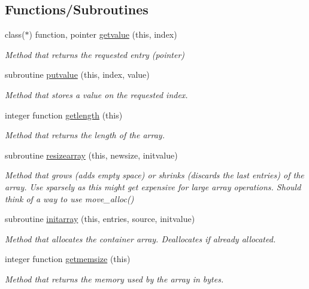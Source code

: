 \subsection*{Functions/\+Subroutines}
\begin{DoxyCompactItemize}
\item 
class($\ast$) function, pointer \mbox{\hyperlink{namespaceabstract__container__array__mod_a2b3e0aec504d76c73bf7f18158924af4}{getvalue}} (this, index)
\begin{DoxyCompactList}\small\item\em Method that returns the requested entry (pointer) \end{DoxyCompactList}\item 
subroutine \mbox{\hyperlink{namespaceabstract__container__array__mod_aae1f6309c51e282a528ce78f128443e0}{putvalue}} (this, index, value)
\begin{DoxyCompactList}\small\item\em Method that stores a value on the requested index. \end{DoxyCompactList}\item 
integer function \mbox{\hyperlink{namespaceabstract__container__array__mod_a22d71ca3f03bf0bb5d3737338e5e349a}{getlength}} (this)
\begin{DoxyCompactList}\small\item\em Method that returns the length of the array. \end{DoxyCompactList}\item 
subroutine \mbox{\hyperlink{namespaceabstract__container__array__mod_adb5b2e1692fa90a0239e9a0bcdc7967d}{resizearray}} (this, newsize, initvalue)
\begin{DoxyCompactList}\small\item\em Method that grows (adds empty space) or shrinks (discards the last entries) of the array. Use sparsely as this might get expensive for large array operations. Should think of a way to use move\+\_\+alloc() \end{DoxyCompactList}\item 
subroutine \mbox{\hyperlink{namespaceabstract__container__array__mod_a793ed0fff6fc6c5823f1e7f119f44959}{initarray}} (this, entries, source, initvalue)
\begin{DoxyCompactList}\small\item\em Method that allocates the container array. Deallocates if already allocated. \end{DoxyCompactList}\item 
integer function \mbox{\hyperlink{namespaceabstract__container__array__mod_a6733f8c7202ec84585ac4f52b6798f02}{getmemsize}} (this)
\begin{DoxyCompactList}\small\item\em Method that returns the memory used by the array in bytes. \end{DoxyCompactList}\end{DoxyCompactItemize}
